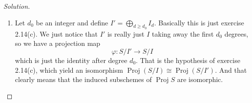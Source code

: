 \begin{proof}[Solution]
\begin{enumerate}[label=\alph*.]
For $\supseteq$ we want to see that $\mathfrak{q}=\varphi^{-1}(\varphi(\mathfrak{q}))$. Suppose that there exists $x\in\varphi^{-1}(\varphi(\mathfrak{q}))\setminus \mathfrak{q}$. Then there exists $y\in\mathfrak{q}$ such that  $\varphi (x)=\varphi (y)\implies \varphi (x-y)=0$. But $0=(x-y)\subset \bigcap_{\mathfrak{p}\in\operatorname{Proj}T} \varphi(\mathfrak{p})$, meaning $x-y\in\mathfrak{q}$, but that is not possible since $ x\not\in\mathfrak{q}$.

	{\color{6}\bfseries ($f$ is a homeomorphism.)}\hspace{.5em} It preserves inclusions of ideals?

{\color{6}\bfseries (Induced map on stalks is surjective.)}\hspace{.5em}What is going on?

\begin{remark}[Gortz, p. 57]
A morphism $(f,f ^\flat):X\to Y$ of ringed spaces induces morphisms on the stalks as follows. Let $x\in X$. Let $f^\sharp:f^{-1}\mathcal{O}_Y\to  \mathcal{O}_X$ be the morphism corresponding to $f ^\flat$ by adjointness. Using the identification $(f^{-1}\mathcal{O}_Y)_x=\mathcal{O}_{Y,f(x)}$ established in $(2.8.2)$ we get
\[f^\sharp _x:\mathcal{O}_{Y,f(x)}\longrightarrow \mathcal{O}_{X,x}.\]
\end{remark}
So I'm not really sure how this is defined but we are looking at a map
\[f^\sharp _x:\mathcal{O}_{f(\operatorname{Proj}T)}\longrightarrow \mathcal{O}_{\operatorname{Proj}S}\]

	Ah! Now I see:
	\begin{thing4}{Proposition 2.5}\leavevmode
	\begin{enumerate}[label=\alph*.]
		\item For any $\mathfrak{p}\in\operatorname{Proj}S$, the stalk $\mathcal{O}_\mathfrak{p}$ is isomorphic to the local sing $S_{(\mathfrak{p})}$.
	\end{enumerate}
	\end{thing4}
So in fact we have some map $f^\sharp_\mathfrak{p}:S_{(\varphi^{-1}(\mathfrak{p}))}\longrightarrow T_{(\mathfrak{p})}$. How is this is defined? but in a broad sense we know this is a map induced by $\varphi$, which was surjective, acting on the localizations of $S$ and $T$, which are really $S$ and $T$ made larger by adding some fractions.

\item Let $d_0$ be an integer and define $I'=\bigoplus_{d\geq d_0}I_d$. Basically this is just exercise 2.14(c). We just notice that $I'$ is really just  $I$ taking away the first $d_0$ degrees, so we have a projection map
	\[\varphi:S/I'\to S/I\]
	which is just the identity after degree $d_0$. That is the hypothesis of exercise 2.14(c), which yield an isomorphism $\operatorname{Proj}(S/I)\cong \operatorname{Proj}(S/I')$. And that clearly means that the induced subschemes of $\operatorname{Proj}S$ are isomorphic.
	\end{enumerate}
\end{proof}

